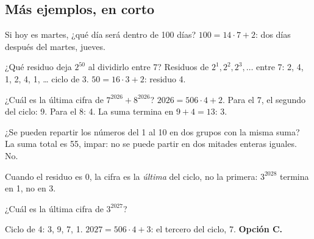 \subsection{Más ejemplos, en corto}
\begin{ejemplo}
Si hoy es martes, ¿qué día será dentro de 100 días?
\solucion $100 = 14 \cdot 7 + 2$: dos días después del martes, jueves.
\end{ejemplo}

\begin{ejemplo}
¿Qué residuo deja $2^{50}$ al dividirlo entre 7?
\solucion Residuos de $2^1, 2^2, 2^3, \ldots$ entre 7: 2, 4, 1, 2, 4, 1, … ciclo de 3. $50 = 16 \cdot 3 + 2$: residuo 4.
\end{ejemplo}

\begin{ejemplo}
¿Cuál es la última cifra de $7^{2026} + 8^{2026}$?
\solucion $2026 = 506 \cdot 4 + 2$. Para el 7, el segundo del ciclo: 9. Para el 8: 4. La suma termina en $9 + 4 = 13$: 3.
\end{ejemplo}

\begin{ejemplo}[Paridad]
¿Se pueden repartir los números del 1 al 10 en dos grupos con la misma suma?
\solucion La suma total es 55, impar: no se puede partir en dos mitades enteras iguales. No.
\end{ejemplo}

\begin{trampa}
Cuando el residuo es 0, la cifra es la \emph{última} del ciclo, no la primera: $3^{2028}$ termina en 1, no en 3.
\end{trampa}

\begin{reto}
¿Cuál es la última cifra de $3^{2027}$?
\end{reto}

\begin{retoresuelto}
Ciclo de 4: 3, 9, 7, 1. $2027 = 506 \cdot 4 + 3$: el tercero del ciclo, 7. \textbf{Opción C.}
\end{retoresuelto}


